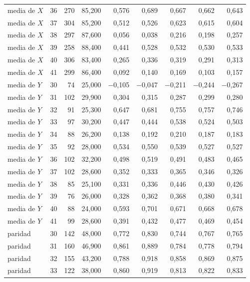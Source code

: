 \begin{table}[htbp]
{\begin{tabular}{@{}lrrrrrrrr@{}}
        media de $X$ & 36 & 270 & 85,200 & 0,576 & 0,689 & 0,667 & 0,662 & 0,643 \\
        media de $X$ & 37 & 304 & 85,200 & 0,512 & 0,526 & 0,623 & 0,615 & 0,604 \\
        media de $X$ & 38 & 297 & 87,600 & 0,056 & 0,038 & 0,216 & 0,198 & 0,257 \\
        media de $X$ & 39 & 258 & 88,400 & 0,441 & 0,528 & 0,532 & 0,530 & 0,533 \\
        media de $X$ & 40 & 306 & 83,400 & 0,265 & 0,336 & 0,319 & 0,291 & 0,313 \\
        media de $X$ & 41 & 299 & 86,400 & 0,092 & 0,140 & 0,169 & 0,103 & 0,157 \\
        media de $Y$ & 30 & 74 & 25,000 & $-$0,105 & $-$0,047 & $-$0,211 & $-$0,244 & $-$0,267 \\
        media de $Y$ & 31 & 102 & 29,900 & 0,304 & 0,315 & 0,287 & 0,299 & 0,280 \\
        media de $Y$ & 32 & 91 & 25,300 & 0,647 & 0,681 & 0,755 & 0,757 & 0,746 \\
        media de $Y$ & 33 & 97 & 30,200 & 0,447 & 0,444 & 0,538 & 0,524 & 0,503 \\
        media de $Y$ & 34 & 88 & 26,200 & 0,138 & 0,192 & 0,210 & 0,187 & 0,183 \\
        media de $Y$ & 35 & 92 & 28,000 & 0,534 & 0,550 & 0,539 & 0,527 & 0,527 \\
        media de $Y$ & 36 & 102 & 32,200 & 0,498 & 0,519 & 0,491 & 0,483 & 0,465 \\
        media de $Y$ & 37 & 102 & 28,600 & 0,352 & 0,333 & 0,365 & 0,346 & 0,326 \\
        media de $Y$ & 38 & 85 & 25,100 & 0,331 & 0,336 & 0,446 & 0,430 & 0,426 \\
        media de $Y$ & 39 & 76 & 26,000 & 0,328 & 0,362 & 0,368 & 0,380 & 0,341 \\
        media de $Y$ & 40 & 88 & 24,000 & 0,593 & 0,701 & 0,671 & 0,668 & 0,678 \\
        media de $Y$ & 41 & 99 & 28,600 & 0,391 & 0,432 & 0,477 & 0,469 & 0,454 \\
        paridad & 30 & 142 & 48,000 & 0,772 & 0,830 & 0,744 & 0,767 & 0,765 \\
        paridad & 31 & 160 & 46,900 & 0,861 & 0,889 & 0,784 & 0,778 & 0,794 \\
        paridad & 32 & 155 & 43,200 & 0,788 & 0,918 & 0,858 & 0,869 & 0,875 \\
        paridad & 33 & 122 & 38,000 & 0,860 & 0,919 & 0,813 & 0,822 & 0,833 \\

\end{tabular}}
\end{table}
